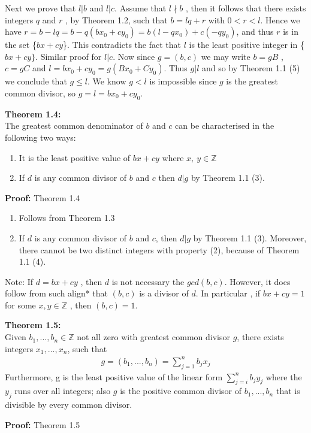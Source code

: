 \documentclass[a4paper]{article}
\begin{document}
Next we prove that $l|b$ and $l|c$. Assume that $l \nmid b$ , then it follows
that there exists integers $q$ and $r$ , by Theorem 1.2, such that $b=lq+r$
with $0<r<l$. Hence we have $r=b-lq=b-q(bx_0+cy_0)=b(l-qx_0)+c(-qy_0)$, and
thus $r$ is in the set \{$bx+cy$\}. This contradicts the fact that $l$ is
the least positive integer in \{$bx+cy\}$. Similar proof for $l|c$. Now since
$g=(b,c)$ we may write $b=gB$ , $c=gC$ and $l=bx_0+cy_0=g(Bx_0+Cy_0)$. Thus
$g|l $ and so by Theorem 1.1 (5) we conclude that $g \leq l$. We know $g<l$
is impossible since $g$ is the greatest common divisor, so $g=l=bx_0+cy_0$.

\textbf{Theorem 1.4:}\\
The greatest common denominator of $b$ and $c$ can be characterised in the
following two ways:
\begin{enumerate}
    \item It is the least positive value of $bx+cy$ where $x,\ y\in\mathbb{Z}$
    \item If $d$ is any common divisor of $b$ and $c$ then $d|g$ by Theorem
1.1 (3).
\end{enumerate}

\textbf{Proof:} Theorem 1.4

\begin{enumerate}
\item Follows from Theorem 1.3
\item If $d$ is any common divisor of $b$ and $c$, then $d|g$ by Theorem
1.1 (3). Moreover, there cannot be two distinct integers with property (2),
because of Theorem 1.1 (4).
\end{enumerate}

Note: If $d=bx+cy$ , then $d$ is not necessary the $gcd(b,c)$. However, it
does follow from such align* that $(b,c)$ is a divisor of $d$. In particular
, if $bx+cy=1$ for some $x,y\in\mathbb{Z}$ , then $(b,c)=1$.

\textbf{Theorem 1.5:}\\
Given $b_1,...,b_n\in\mathbb{Z}$ not all zero with greatest common divisor
$g$,
there exists integers $x_1,...,x_n$,  such that
\begin{align*}
    g=(b_1,...,b_n)=\sum^n_{j=1}b_jx_j
\end{align*}
Furthermore, g is the least positive value of the linear form $\sum^n_{j=i}b_jy_j$
where the $y_j$ runs over all integers; also $g$ is the positive common divisor
of $b_1,...,b_n$
that is divisible by every common divisor.

\textbf{Proof:} Theorem 1.5
\end{document}

